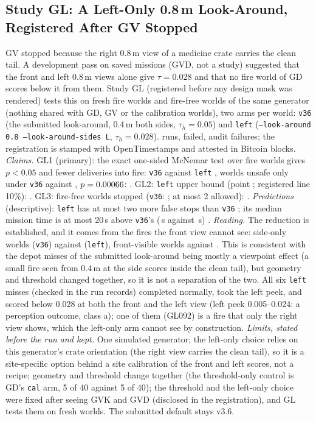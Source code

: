 \documentclass[conference]{IEEEtran}
\begin{document}
\subsection{Study GL: A Left-Only 0.8\,m Look-Around, Registered After GV Stopped}\label{sec:moved-gl}
GV stopped because the right 0.8\,m view of a medicine crate carries the clean tail. A development pass on saved missions (GVD, not a study) suggested that the front and left 0.8\,m views alone give $\tau=0.028$ and that no fire world of GD scores below it from them. Study GL (registered before any design mask was rendered) tests this on \GLWorlds{} fresh fire worlds and \GLPlain{} fire-free worlds of the same generator (nothing shared with GD, GV or the calibration worlds), two arms per world: \texttt{v36} (the submitted look-around, 0.4\,m both sides, $\tau_h=0.05$) and \texttt{left} (\texttt{--look-around 0.8 --look-around-sides L}, $\tau_h=0.028$). \GLTrials{} runs, \GLFailed{} failed, \GLAudit{} audit failures; the registration is stamped with OpenTimestamps and attested in Bitcoin blocks.
\emph{Claims.} GL1 (primary): the exact one-sided McNemar test over fire worlds gives $p<0.05$ and fewer deliveries into fire: \texttt{v36} \GLV{} against \texttt{left} \GLLeft{}, \GLOnlyV{} worlds unsafe only under \texttt{v36} against \GLOnlyLeft{}, $p=0.00066$: \GLOneHolds. GL2: \texttt{left} upper bound \GLLeftUpper{} (point \GLLeftRate; registered line 10\%): \GLTwoHolds. GL3: \GLFalseStops{} fire-free worlds stopped (\texttt{v36}: \GLFalseStopsV; at most 2 allowed): \GLThreeHolds. \emph{Predictions} (descriptive): \texttt{left} has at most two more false stops than \texttt{v36} \GLPredOneHolds; its median mission time is at most 20\,s above \texttt{v36}'s (\GLTimeLeft\,s against \GLTimeV\,s) \GLPredTwoHolds.
\emph{Reading.} The reduction is established, and it comes from the fires the front view cannot see: side-only worlds \GLSideV{} (\texttt{v36}) against \GLSideLeft{} (\texttt{left}), front-visible worlds \GLFrontV{} against \GLFrontLeft{}. This is consistent with the depot misses of the submitted look-around being mostly a viewpoint effect (a small fire seen from 0.4\,m at the side scores inside the clean tail), but geometry and threshold changed together, so it is not a separation of the two. All six \texttt{left} misses (checked in the run records) completed normally, took the left peek, and scored below $0.028$ at both the front and the left view (left peek 0.005--0.024: a perception outcome, class a); one of them (GL092) is a fire that only the right view shows, which the left-only arm cannot see by construction. \emph{Limits, stated before the run and kept.} One simulated generator; the left-only choice relies on this generator's crate orientation (the right view carries the clean tail), so it is a site-specific option behind a site calibration of the front and left scores, not a recipe; geometry and threshold change together (the threshold-only control is GD's \texttt{cal} arm, 5 of 40 against 5 of 40); the threshold and the left-only choice were fixed after seeing GVK and GVD (disclosed in the registration), and GL tests them on fresh worlds. The submitted default stays v3.6.
\end{document}
